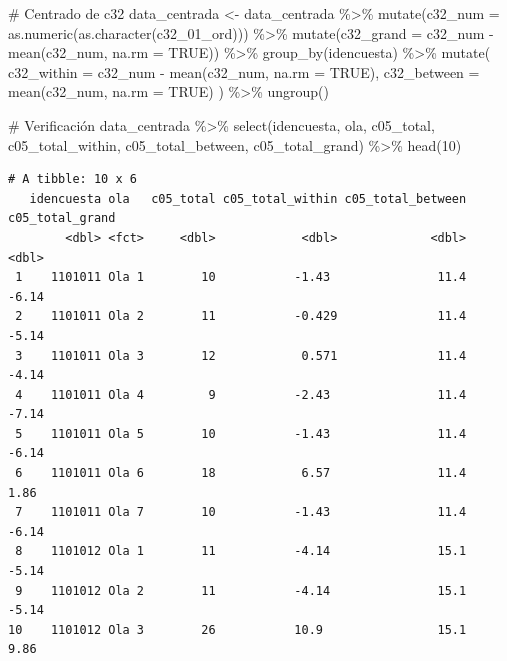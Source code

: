 \documentclass[
  spanish,
  a4paper,
  oneside]{scrbook}
\newenvironment{Shaded}{\begin{snugshade}}{\end{snugshade}}
\newcommand{\AttributeTok}[1]{\textcolor[rgb]{0.40,0.45,0.13}{#1}}
\newcommand{\CommentTok}[1]{\textcolor[rgb]{0.37,0.37,0.37}{#1}}
\newcommand{\ConstantTok}[1]{\textcolor[rgb]{0.56,0.35,0.01}{#1}}
\newcommand{\DecValTok}[1]{\textcolor[rgb]{0.68,0.00,0.00}{#1}}
\newcommand{\FunctionTok}[1]{\textcolor[rgb]{0.28,0.35,0.67}{#1}}
\newcommand{\NormalTok}[1]{\textcolor[rgb]{0.00,0.23,0.31}{#1}}
\newcommand{\OtherTok}[1]{\textcolor[rgb]{0.00,0.23,0.31}{#1}}
\newcommand{\SpecialCharTok}[1]{\textcolor[rgb]{0.37,0.37,0.37}{#1}}
\begin{document}
\begin{Shaded}
\begin{Highlighting}[]
\CommentTok{\# Centrado de c32}
\NormalTok{data\_centrada }\OtherTok{\textless{}{-}}\NormalTok{ data\_centrada }\SpecialCharTok{\%\textgreater{}\%}
  \FunctionTok{mutate}\NormalTok{(}\AttributeTok{c32\_num =} \FunctionTok{as.numeric}\NormalTok{(}\FunctionTok{as.character}\NormalTok{(c32\_01\_ord))) }\SpecialCharTok{\%\textgreater{}\%}
  \FunctionTok{mutate}\NormalTok{(}\AttributeTok{c32\_grand =}\NormalTok{ c32\_num }\SpecialCharTok{{-}} \FunctionTok{mean}\NormalTok{(c32\_num, }\AttributeTok{na.rm =} \ConstantTok{TRUE}\NormalTok{)) }\SpecialCharTok{\%\textgreater{}\%}
  \FunctionTok{group\_by}\NormalTok{(idencuesta) }\SpecialCharTok{\%\textgreater{}\%}
  \FunctionTok{mutate}\NormalTok{(}
    \AttributeTok{c32\_within  =}\NormalTok{ c32\_num }\SpecialCharTok{{-}} \FunctionTok{mean}\NormalTok{(c32\_num, }\AttributeTok{na.rm =} \ConstantTok{TRUE}\NormalTok{),}
    \AttributeTok{c32\_between =} \FunctionTok{mean}\NormalTok{(c32\_num, }\AttributeTok{na.rm =} \ConstantTok{TRUE}\NormalTok{)}
\NormalTok{  ) }\SpecialCharTok{\%\textgreater{}\%}
  \FunctionTok{ungroup}\NormalTok{()}

\CommentTok{\# Verificación}
\NormalTok{data\_centrada }\SpecialCharTok{\%\textgreater{}\%}
  \FunctionTok{select}\NormalTok{(idencuesta, ola, c05\_total, c05\_total\_within,}
\NormalTok{         c05\_total\_between, c05\_total\_grand) }\SpecialCharTok{\%\textgreater{}\%}
  \FunctionTok{head}\NormalTok{(}\DecValTok{10}\NormalTok{)}
\end{Highlighting}
\end{Shaded}

\begin{verbatim}
# A tibble: 10 x 6
   idencuesta ola   c05_total c05_total_within c05_total_between c05_total_grand
        <dbl> <fct>     <dbl>            <dbl>             <dbl>           <dbl>
 1    1101011 Ola 1        10           -1.43               11.4           -6.14
 2    1101011 Ola 2        11           -0.429              11.4           -5.14
 3    1101011 Ola 3        12            0.571              11.4           -4.14
 4    1101011 Ola 4         9           -2.43               11.4           -7.14
 5    1101011 Ola 5        10           -1.43               11.4           -6.14
 6    1101011 Ola 6        18            6.57               11.4            1.86
 7    1101011 Ola 7        10           -1.43               11.4           -6.14
 8    1101012 Ola 1        11           -4.14               15.1           -5.14
 9    1101012 Ola 2        11           -4.14               15.1           -5.14
10    1101012 Ola 3        26           10.9                15.1            9.86
\end{verbatim}
\end{document}
